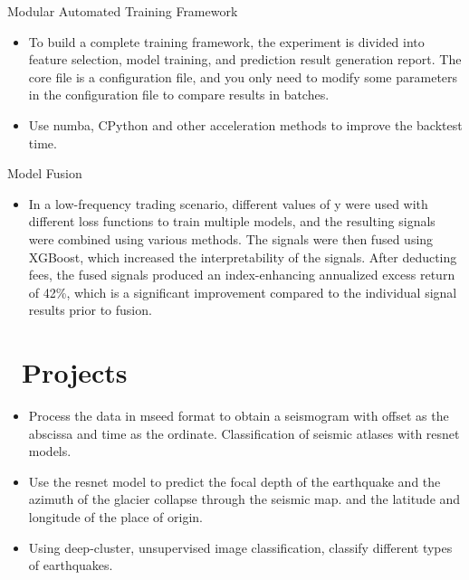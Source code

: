\documentclass{resume}
\begin{document}
Modular Automated Training Framework
\begin{itemize}
  \item To build a complete training framework, the experiment is divided into feature selection, model training, and prediction result generation report. The core file is a configuration file, and you only need to modify some parameters in the configuration file to compare results in batches.
  \item Use numba, CPython and other acceleration methods to improve the backtest time.
\end{itemize}
Model Fusion
\begin{itemize}
  \item In a low-frequency trading scenario, different values of y were used with different loss functions to train multiple models, and the resulting signals were combined using various methods. The signals were then fused using XGBoost, which increased the interpretability of the signals. After deducting fees, the fused signals produced an index-enhancing annualized excess return of 42\%, which is a significant improvement compared to the individual signal results prior to fusion.
\end{itemize}

\section{\faObjectGroup\ Projects}
\begin{itemize}
  \item Process the data in mseed format to obtain a seismogram with offset as the abscissa and time as the ordinate.
  Classification of seismic atlases with resnet models.
  \item Use the resnet model to predict the focal depth of the earthquake and the azimuth of the glacier collapse through the seismic map. and the latitude and longitude of the place of origin.
  \item Using deep-cluster, unsupervised image classification, classify different types of earthquakes.
\end{itemize}
\end{document}
